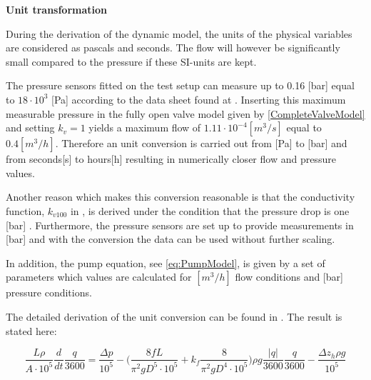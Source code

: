 \textbf{Unit transformation}
\label{unittransform}

During the derivation of the dynamic model, the units of the physical variables are considered as pascals and seconds. The flow will however be significantly small compared to the pressure if these SI-units are kept.

The pressure sensors fitted on the test setup can measure up to 0.16 [bar] equal to $18 \cdot 10^3$ [Pa] according to the data sheet found at . Inserting this maximum measurable pressure in the fully open valve model given by \eqref{CompleteValveModel} and setting $k_v=1$ yields a maximum flow of $1.11 \cdot 10^{-4} [m^3/s]$ equal to $0.4 [m^3/h]$. 
Therefore an unit conversion is carried out from [Pa] to [bar] and from seconds[s] to hours[h] resulting in numerically closer flow and pressure values. 

Another reason which makes this conversion reasonable is that the conductivity function, $k_{v100}$ in , is derived under the condition that the pressure drop is one [bar] \cite{keller}. Furthermore, the pressure sensors are set up to provide measurements in [bar] and with the conversion the data can be used without further scaling.  

In addition, the pump equation, see \eqref{eq:PumpModel}, is given by a set of parameters which values are calculated for $[m^3/h]$ flow conditions and [bar] pressure conditions. 



The detailed derivation of the unit conversion can be found in . The result is stated here: 

\begin{equation}
   \frac{L \rho}{A\cdot10^5} \frac{d}{dt}\frac{q}{3600} = \frac{\Delta p}{10^5} - \Big(\frac{8fL}{\pi^{2}gD^5\cdot10^5} + k_f \frac{8}{\pi^2gD^4\cdot10^5}\Big) \rho g \frac{|q|}{3600} \frac{q}{3600} - \frac{\Delta z_h \rho g}{10^5}
\end{equation}
